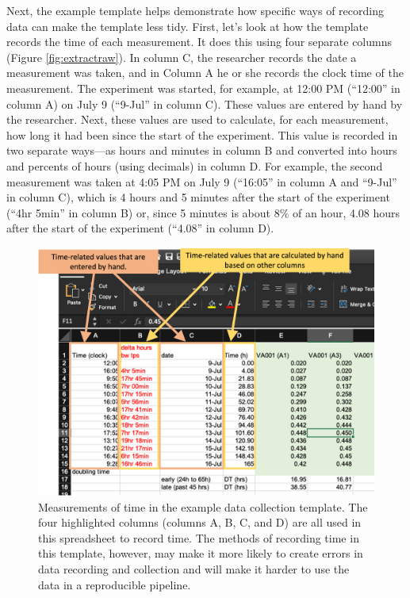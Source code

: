 \documentclass[]{tufte-book}
\begin{document}
Next, the example template helps demonstrate how specific ways of recording data
can make the template less tidy. First, let's look at how the template records
the time of each measurement. It does this using four separate columns
(Figure \ref{fig:extractraw}). In column C, the researcher records the date a
measurement was taken, and in Column A he or she records the clock time of the
measurement. The experiment was started, for example, at 12:00 PM (``12:00'' in column A)
on July 9 (``9-Jul'' in column C). These values are entered by hand by the researcher.
Next, these values are used to calculate, for each measurement, how long it had been
since the start of the experiment. This value is recorded in two separate ways---as
hours and minutes in column B and converted into hours and percents of hours (using
decimals) in column D. For example, the second measurement was taken at 4:05 PM
on July 9 (``16:05'' in column A and ``9-Jul'' in column C), which is 4 hours and 5 minutes
after the start of the experiment (``4hr 5min'' in column B) or, since 5 minutes is about
8\% of an hour, 4.08 hours after the start of the experiment (``4.08'' in column D).

\begin{figure}
\includegraphics[width=\textwidth]{figures/growth_curve_time_measures} \caption[Measurements of time in the example data collection template]{Measurements of time in the example data collection template. The four highlighted columns (columns A, B, C, and D) are all used in this spreadsheet to record time. The methods of recording time in this template, however, may make it more likely to create errors in data recording and collection and will make it harder to use the data in a reproducible pipeline.}\label{fig:timemeasures}
\end{figure}
\end{document}
